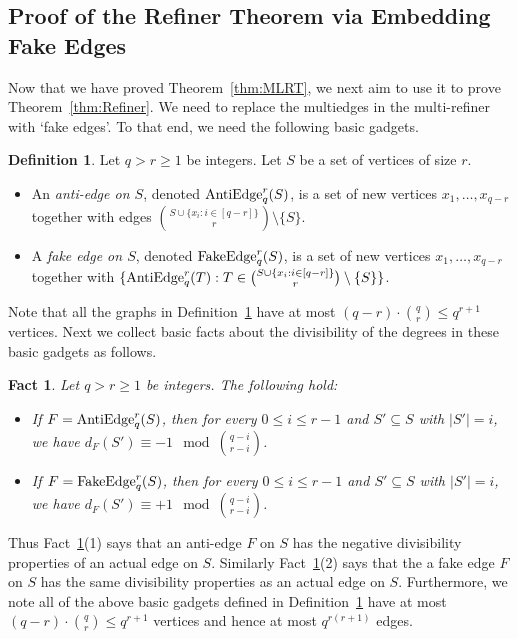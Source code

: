 \documentclass[11pt]{article}
\newcounter{i}
\theoremstyle{plain}
\newtheorem{fact}[thm]{Fact}
\theoremstyle{plain} %
\theoremstyle{definition}
\newtheorem{definition}[thm]{Definition}
\begin{document}
\subsection{Proof of the Refiner Theorem via Embedding Fake Edges}\label{ss:Basic}

Now that we have proved Theorem~\ref{thm:MLRT}, we next aim to use it to prove Theorem~\ref{thm:Refiner}. We need to replace the multiedges in the multi-refiner with `fake edges'. To that end, we need the following basic gadgets.

\begin{definition}\label{def:BasicGadget}
Let $q>r\ge 1$ be integers. Let $S$ be a set of vertices of size $r$.
\begin{itemize}
    \item An \emph{anti-edge on $S$}, denoted ${\rm AntiEdge}_q^r(S)$, is a set of new vertices $x_1,\ldots, x_{q-r}$ together with edges $\binom{S\cup \{x_i:i\in[q-r]\} }{r} \setminus \{S\}$.
    \item A \emph{fake edge on $S$}, denoted ${\rm FakeEdge}_q^r(S)$, is a set of new vertices $x_1,\ldots, x_{q-r}$ together with  $\{ {\rm AntiEdge}_q^r(T): T\in \binom{S\cup \{x_i:i\in[q-r]\} }{r} \setminus \{S\} \}$.
\end{itemize}    
\end{definition}

Note that all the graphs in Definition~\ref{def:BasicGadget} have at most $(q-r)\cdot \binom{q}{r} \le q^{r+1}$ vertices. Next we collect basic facts about the divisibility of the degrees in these basic gadgets as follows.

\begin{fact}\label{fact:Div}
Let $q> r \ge 1$ be integers. The following hold:
\begin{itemize}
    \item[(1)] If $F={\rm AntiEdge}_q^r(S)$, then for every $0\le i \le r-1$ and $S'\subseteq S$ with $|S'|=i$, we have $d_F(S') \equiv -1 \mod \binom{q-i}{r-i}$.
    \item[(2)] If $F={\rm FakeEdge}_q^r(S)$, then for every $0\le i \le r-1$ and $S'\subseteq S$ with $|S'|=i$, we have $d_F(S') \equiv +1 \mod \binom{q-i}{r-i}$.
\end{itemize}
\end{fact}

Thus Fact~\ref{fact:Div}(1) says that an anti-edge $F$ on $S$ has the negative divisibility properties of an actual edge on $S$. Similarly Fact~\ref{fact:Div}(2) says that the a fake edge $F$ on $S$ has the same divisibility properties as an actual edge on $S$.  Furthermore, we note all of the above basic gadgets defined in Definition~\ref{def:BasicGadget} have at most $(q-r)\cdot \binom{q}{r} \le q^{r+1}$ vertices and hence at most $q^{r(r+1)}$ edges.
\end{document}
